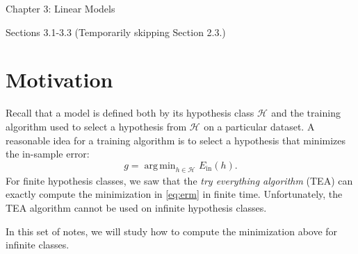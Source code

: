 \documentclass[10pt]{exam}
\theoremstyle{definition}
\newtheorem{defn}{Definition}
\DeclareMathOperator*{\argmin}{arg\,min}
\newcommand{\Ein}{E_{\text{in}}}
\newcommand{\HH}[1]{\mathcal H_{\text{#1}}}
\begin{document}
\begin{center}
{
\Huge
Chapter 3: Linear Models
}

    \vspace{0.05in}
{
\Large
Sections 3.1-3.3
    (Temporarily skipping Section 2.3.)
}
\end{center}


\section*{Motivation}

Recall that a model is defined both by its hypothesis class $\HH{}$ and the training algorithm used to select a hypothesis from $\HH{}$ on a particular dataset.
A reasonable idea for a training algorithm is to select a hypothesis that minimizes the in-sample error:
\begin{equation}
    \label{eq:erm}
    g = \argmin_{h\in\HH{}} \Ein(h).
\end{equation}
%
    For finite hypothesis classes, we saw that the \emph{try everything algorithm} (TEA) can exactly compute the minimization in \eqref{eq:erm} in finite time.
    Unfortunately, the TEA algorithm cannot be used on infinite hypothesis classes.

    In this set of notes, we will study how to compute the minimization above for infinite classes.
%
\end{document}

